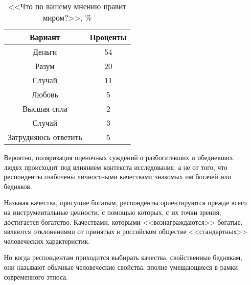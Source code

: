 \begin{table}[h!]
    \centering
    \begin{tabular}{|c|c|}
        \hline
        Вариант & Проценты \\ \hline \hline
        Деньги & 54 \\ \hline
        Разум & 20 \\ \hline
        Случай & 11 \\ \hline
        Любовь & 5 \\ \hline
        Высшая сила & 2 \\ \hline
        Случай & 3 \\ \hline
        Затрудняюсь ответить & 5 \\ \hline
    \end{tabular}
    \caption{<<Что по вашему мнению правит миром?>>, \%}
\end{table}

Вероятно, поляризация оценочных суждений о разбогатевших и обедневших людях 
происходит под влиянием контекста исследования, а не от того, что респонденты 
озабочены личностными качествами знакомых им богачей или бедняков. 

Называя качества, присущие богатым, респонденты ориентируются прежде всего 
на инструментальные ценности, с помощью которых, с их точки зрения, достигается 
богатство. Качествами, которыми <<вознаграждаются>> богатые, являются 
отклонениями от принятых в российском обществе <<стандартных>> человеческих 
характеристик. 

Но когда респондентам приходится выбирать качества, свойственные беднякам, они 
называют обычные человеческие свойства, вполне умещающиеся в рамки современного 
этноса.

